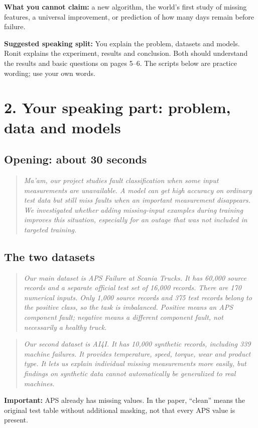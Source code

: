 \documentclass[11pt,a4paper]{article}
\newcommand{\say}[1]{\begin{quote}\itshape #1\end{quote}}
\begin{document}
\textbf{What you cannot claim:} a new algorithm, the world's first study of missing features, a universal improvement, or prediction of how many days remain before failure.

\textbf{Suggested speaking split:} You explain the problem, datasets and models. Ronit explains the experiment, results and conclusion. Both should understand the results and basic questions on pages 5--6. The scripts below are practice wording; use your own words.

\newpage
\section*{2. Your speaking part: problem, data and models}
\subsection*{Opening: about 30 seconds}
\say{Ma'am, our project studies fault classification when some input measurements are unavailable. A model can get high accuracy on ordinary test data but still miss faults when an important measurement disappears. We investigated whether adding missing-input examples during training improves this situation, especially for an outage that was not included in targeted training.}

\subsection*{The two datasets}
\say{Our main dataset is APS Failure at Scania Trucks. It has 60,000 source records and a separate official test set of 16,000 records. There are 170 numerical inputs. Only 1,000 source records and 375 test records belong to the positive class, so the task is imbalanced. Positive means an APS component fault; negative means a different component fault, not necessarily a healthy truck.}

\say{Our second dataset is AI4I. It has 10,000 synthetic records, including 339 machine failures. It provides temperature, speed, torque, wear and product type. It lets us explain individual missing measurements more easily, but findings on synthetic data cannot automatically be generalized to real machines.}

\textbf{Important:} APS already has missing values. In the paper, ``clean'' means the original test table without additional masking, not that every APS value is present.
\end{document}
